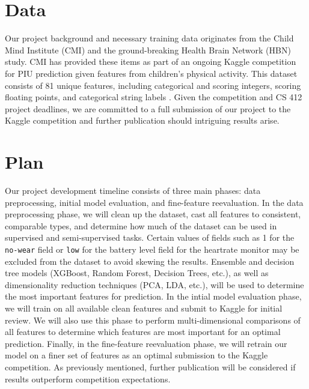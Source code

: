 \documentclass[12pt]{extarticle}
\begin{document}
\section{Data}

Our project background and necessary training data originates from the Child Mind Institute (CMI) and the ground-breaking Health Brain Network (HBN) study.
CMI has provided these items as part of an ongoing Kaggle competition for PIU prediction given features from children's physical activity. 
This dataset consists of 81 unique features, including categorical and scoring integers, scoring floating points, and categorical string labels \cite{child-mind-institute-problematic-internet-use}.
Given the competition and CS 412 project deadlines, we are committed to a full submission of our project to the Kaggle competition and further publication should intriguing results arise.

\section{Plan}

Our project development timeline consists of three main phases: data preprocessing, initial model evaluation, and fine-feature reevaluation.
In the data preprocessing phase, we will clean up the dataset, cast all features to consistent, comparable types, and determine how much of the dataset can be used in supervised and semi-supervised tasks. Certain values of fields such as 1 for the \texttt{no-wear} field or \texttt{low} for the battery level field for the heartrate monitor may be excluded from the dataset to avoid skewing the results.
Ensemble and decision tree models (XGBoost, Random Forest, Decision Trees, etc.), as well as dimensionality reduction techniques (PCA, LDA, etc.), will be used to determine the most important features for prediction.
In the intial model evaluation phase, we will train on all available clean features and submit to Kaggle for initial review. 
We will also use this phase to perform multi-dimensional comparisons of all features to determine which features are most important for an optimal prediction.
Finally, in the fine-feature reevaluation phase, we will retrain our model on a finer set of features as an optimal submission to the Kaggle competition.
As previously mentioned, further publication will be considered if results outperform competition expectations.



\end{document}
